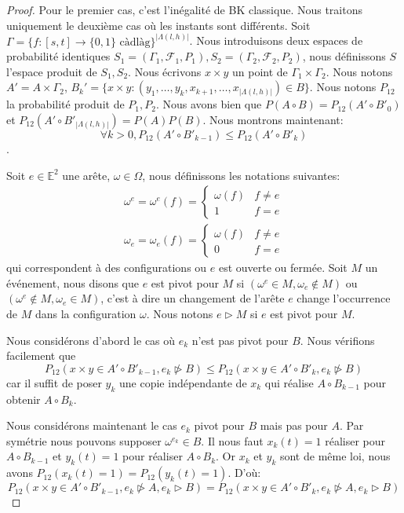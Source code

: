 \documentclass[titlepage,a4paper,12pt]{article}
\newcounter{cor}
\begin{document}
\begin{proof}
Pour le premier cas, c'est l'inégalité de BK classique. Nous traitons uniquement le deuxième cas où les instants sont différents. Soit $\Gamma = \{f:[s,t]\rightarrow\{0,1\}\text{ càdlàg} \}^{|\Lambda(l,h)|}$. Nous introduisons deux espaces de probabilité identiques $S_1 = (\Gamma_1,\mathcal{F}_1,P_1), S_2 = (\Gamma_2,\mathcal{F}_2,P_2)$, nous définissons $S$ l'espace produit de $S_1,S_2$. Nous écrivons $x\times y$ un point de $\Gamma_1 \times \Gamma_2$. Nous notons $A' = A\times \Gamma_2$, $B_k' = \{x\times y :(y_1,\dots,y_k,x_{k+1},\dots,x_{|\Lambda(l,h)|}) \in B\}$. Nous notons $P_{12}$ la probabilité produit de $P_1,P_2$. Nous avons bien que $P(A\circ B) = P_{12}(A'\circ B'_0)$ et $P_{12}(A'\circ B'_{|\Lambda(l,h)|}) = P(A)P(B)$. Nous montrons maintenant: $$\forall k>0, P_{12}(A'\circ B'_{k-1}) \leqslant P_{12}(A'\circ B'_k)$$. 

Soit $e\in \mathbb{E}^2$ une arête, $\omega\in \Omega$, nous définissons les notations suivantes:
$$\begin{array}{c}
 \omega^e = \omega^e(f) = \left\lbrace \begin{array}{cc}
	\omega(f) & f\neq e \\
	1 & f=e 
 \end{array}\right. \\
 \omega_e = \omega_e(f) = \left\lbrace \begin{array}{cc}
	\omega(f) & f\neq e \\
	0 & f=e
 \end{array}\right.
\end{array}$$
qui correspondent à des configurations ou $e$ est ouverte ou fermée. Soit $M$ un événement, nous disons que $e$ est pivot pour $M$ si $(\omega^e \in M, \omega_e\notin M)$ ou $(\omega^e \notin M, \omega_e\in M)$, c'est à dire un changement de l'arête $e$ change l'occurrence de $M$ dans la configuration $\omega$. Nous notons $e\triangleright M$ si $e$ est pivot pour $M$.

Nous considérons d'abord le cas où $e_k$ n'est pas pivot pour $B$. Nous vérifions facilement que 
$$ P_{12}(x\times y \in A'\circ B'_{k-1}, e_k \ntriangleright B) \leqslant P_{12}(x\times y \in A'\circ B'_k,e_k \ntriangleright B)
$$
car il suffit de poser $y_k$ une copie indépendante de $x_k$ qui réalise $A\circ B_{k-1}$ pour obtenir $A\circ B_k$.

Nous considérons maintenant le cas $e_k$ pivot pour $B$ mais pas pour $A$. Par symétrie nous pouvons supposer $ \omega^{e_k}\in B$. Il nous faut $x_k(t)=1$ réaliser pour $A\circ B_{k-1}$ et $y_k(t)= 1$ pour réaliser $A\circ B_k$. Or $x_k$ et $y_k$ sont de même loi, nous avons $P_{12}(x_k(t)=1) = P_{12}(y_k(t)=1)$. D'où:
$$P_{12}(x\times y \in A'\circ B'_{k-1}, e_k \ntriangleright A,e_k \triangleright B) = P_{12}(x\times y \in A'\circ B'_k,e_k \ntriangleright A, e_k \triangleright B)
$$


\end{proof}
\end{document}
